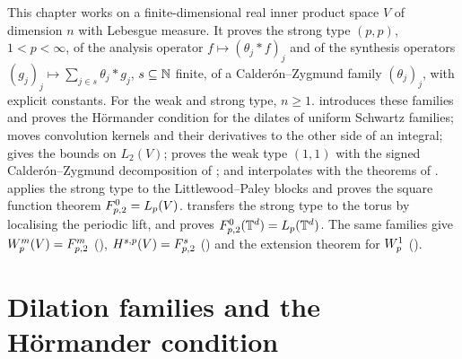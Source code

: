 This chapter works on a finite-dimensional real inner product space $V$ of dimension $n$ with
Lebesgue measure. It proves the strong type $(p,p)$, $1 < p < \infty$, of the analysis operator
$f \mapsto (\theta_j * f)_j$ and of the synthesis operators
$(g_j)_j \mapsto \sum_{j \in s} \theta_j * g_j$, $s \subseteq \mathbb{N}$ finite, of a
Calder\'on--Zygmund family $(\theta_j)_j$, with explicit constants. For the weak and strong
type, $n \geq 1$.  introduces these families and proves the
H\"ormander condition for the dilates of uniform Schwartz families;
 moves convolution kernels and their derivatives to the other side
of an integral;  gives the bounds on $L_2(V)$;
 proves the weak type $(1,1)$ with the signed
Calder\'on--Zygmund decomposition of ; and
 interpolates with the theorems of
.  applies the strong type to the
Littlewood--Paley blocks and proves the square function theorem $F^{0}_{p,2} = L_p(V)$.
 transfers the strong type to the torus by localising the
periodic lift, and  proves
$F^{0}_{p,2}(\mathbb{T}^d) = L_p(\mathbb{T}^d)$. The same
families give $W^{m}_{p}(V) = F^{m}_{p,2}$ (),
$H^{s,p}(V) = F^{s}_{p,2}$ () and the extension theorem for
$W^{1}_{p}$ ().

\section{Dilation families and the H\"ormander condition}
\label{sec:dilation-families}

